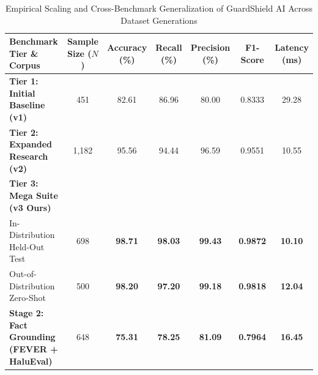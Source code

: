 
\begin{table}[t]
\centering
\small
\caption{Empirical Scaling and Cross-Benchmark Generalization of GuardShield AI Across Dataset Generations}
\label{tab:mega_benchmark_results}
\begin{tabular}{lcccccc}
\toprule
\textbf{Benchmark Tier \& Corpus} & \textbf{Sample Size ($N$)} & \textbf{Accuracy (\%)} & \textbf{Recall (\%)} & \textbf{Precision (\%)} & \textbf{F1-Score} & \textbf{Latency (ms)} \\
\midrule
\textbf{Tier 1: Initial Baseline (v1)} & 451 & 82.61 & 86.96 & 80.00 & 0.8333 & 29.28 \\
\textbf{Tier 2: Expanded Research (v2)} & 1,182 & 95.56 & 94.44 & 96.59 & 0.9551 & 10.55 \\
\midrule
\textbf{Tier 3: Mega Suite (v3 Ours)} & & & & & & \\
\quad In-Distribution Held-Out Test & 698 & \textbf{98.71} & \textbf{98.03} & \textbf{99.43} & \textbf{0.9872} & \textbf{10.10} \\
\quad Out-of-Distribution Zero-Shot & 500 & \textbf{98.20} & \textbf{97.20} & \textbf{99.18} & \textbf{0.9818} & \textbf{12.04} \\
\midrule
\textbf{Stage 2: Fact Grounding (FEVER + HaluEval)} & 648 & \textbf{75.31} & \textbf{78.25} & \textbf{81.09} & \textbf{0.7964} & \textbf{16.45} \\
\bottomrule
\end{tabular}
\end{table}
